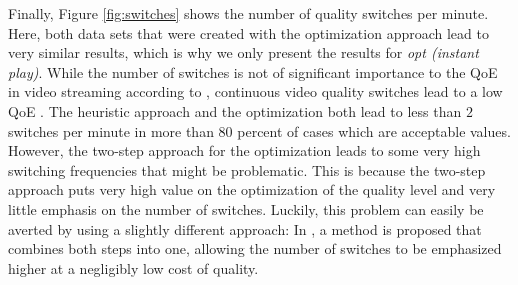 Finally, Figure \ref{fig:switches} shows the number of quality switches per minute. Here, both data sets that were created with the optimization approach lead to very similar results, which is why we only present the results for \textit{opt (instant play)}. While the number of switches is not of significant importance to the QoE in video streaming according to \cite{seufert2015survey}, continuous video quality switches lead to a low QoE \cite{liu2013user}. The heuristic approach and the optimization both lead to less than $2$ switches per minute in more than $80$ percent of cases which are acceptable values. However, the two-step approach for the optimization leads to some very high switching frequencies that might be problematic. This is because the two-step approach puts very high value on the optimization of the quality level and very little emphasis on the number of switches. Luckily, this problem can easily be averted by using a slightly different approach: In \cite{liotou2016enriching}, a method is proposed that combines both steps into one, allowing the number of switches to be emphasized higher at a negligibly low cost of quality.

